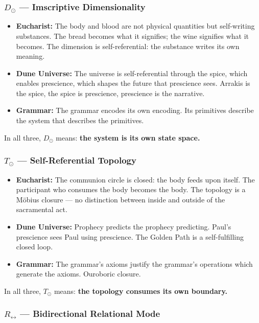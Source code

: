 \documentclass[12pt,a4paper]{article}
\begin{document}
\subsubsection{$D_{\odot}$ --- Imscriptive Dimensionality}

\begin{itemize}
    \item \textbf{Eucharist:} The body and blood are not physical quantities but self-writing substances. The bread becomes what it signifies; the wine signifies what it becomes. The dimension is self-referential: the substance writes its own meaning.
    \item \textbf{Dune Universe:} The universe is self-referential through the spice, which enables prescience, which shapes the future that prescience sees. Arrakis is the spice, the spice is prescience, prescience is the narrative.
    \item \textbf{Grammar:} The grammar encodes its own encoding. Its primitives describe the system that describes the primitives.
\end{itemize}

In all three, $D_{\odot}$ means: \textbf{the system is its own state space.}

\subsubsection{$T_{\odot}$ --- Self-Referential Topology}

\begin{itemize}
    \item \textbf{Eucharist:} The communion circle is closed: the body feeds upon itself. The participant who consumes the body becomes the body. The topology is a Möbius closure --- no distinction between inside and outside of the sacramental act.
    \item \textbf{Dune Universe:} Prophecy predicts the prophecy predicting. Paul's prescience sees Paul using prescience. The Golden Path is a self-fulfilling closed loop.
    \item \textbf{Grammar:} The grammar's axioms justify the grammar's operations which generate the axioms. Ouroboric closure.
\end{itemize}

In all three, $T_{\odot}$ means: \textbf{the topology consumes its own boundary.}

\subsubsection{$R_{\leftrightarrow}$ --- Bidirectional Relational Mode}
\end{document}
